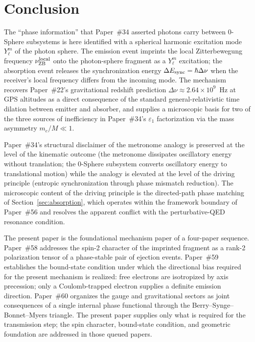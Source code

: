 \documentclass[%
 reprint, amsmath,amssymb, aps, prb, ]{revtex4-2}
\numberwithin{equation}{section}
\newcommand{\nuZBl}{\nu_{\text{ZB}}^{\rm local}}
\begin{document}
\section{Conclusion}
\label{sec:conclusion}

The ``phase information'' that Paper~\#34 asserted photons carry between 0-Sphere subsystems is here identified with a spherical harmonic excitation mode $Y_\ell^m$ of the photon sphere. The emission event imprints the local Zitterbewegung frequency $\nuZBl$ onto the photon-sphere fragment as a $Y_\ell^m$ excitation; the absorption event releases the synchronization energy $\Delta E_{\rm sync} = \hbar\Delta\nu$ when the receiver's local frequency differs from the incoming mode. The mechanism recovers Paper~\#22's gravitational redshift prediction $\Delta\nu \approx 2.64\times 10^9$~Hz at GPS altitudes as a direct consequence of the standard general-relativistic time dilation between emitter and absorber, and supplies a microscopic basis for two of the three sources of inefficiency in Paper~\#34's $\varepsilon_1$ factorization via the mass asymmetry $m_e/M \ll 1$.

Paper~\#34's structural disclaimer of the metronome analogy is preserved at the level of the kinematic outcome (the metronome dissipates oscillatory energy without translation; the 0-Sphere subsystem converts oscillatory energy to translational motion) while the analogy is elevated at the level of the driving principle (entropic synchronization through phase mismatch reduction). The microscopic content of the driving principle is the directed-path phase matching of Section~\ref{sec:absorption}, which operates within the framework boundary of Paper~\#56 and resolves the apparent conflict with the perturbative-QED resonance condition.

The present paper is the foundational mechanism paper of a four-paper sequence. Paper~\#58 addresses the spin-2 character of the imprinted fragment as a rank-2 polarization tensor of a phase-stable pair of ejection events. Paper~\#59 establishes the bound-state condition under which the directional bias required for the present mechanism is realized: free electrons are isotropized by axis precession; only a Coulomb-trapped electron supplies a definite emission direction. Paper~\#60 organizes the gauge and gravitational sectors as joint consequences of a single internal phase functional through the Berry--Synge--Bonnet--Myers triangle. The present paper supplies only what is required for the transmission step; the spin character, bound-state condition, and geometric foundation are addressed in those queued papers.
\end{document}
